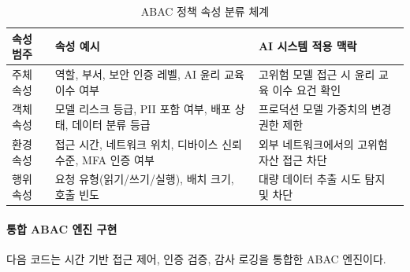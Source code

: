 \begin{table}[htbp]
\centering
\caption{ABAC 정책 속성 분류 체계}
\label{tab:abac_attributes}
\begin{tabularx}{\textwidth}{p{2cm}p{3cm}X}
\toprule
\textbf{속성 범주} & \textbf{속성 예시} & \textbf{AI 시스템 적용 맥락} \\
\midrule
주체 속성 & 역할, 부서, 보안 인증 레벨, AI 윤리 교육 이수 여부 & 고위험 모델 접근 시 윤리 교육 이수 요건 확인 \\
객체 속성 & 모델 리스크 등급, PII 포함 여부, 배포 상태, 데이터 분류 등급 & 프로덕션 모델 가중치의 변경 권한 제한 \\
환경 속성 & 접근 시간, 네트워크 위치, 디바이스 신뢰 수준, MFA 인증 여부 & 외부 네트워크에서의 고위험 자산 접근 차단 \\
행위 속성 & 요청 유형(읽기/쓰기/실행), 배치 크기, 호출 빈도 & 대량 데이터 추출 시도 탐지 및 차단 \\
\bottomrule
\end{tabularx}
\end{table}

\paragraph{통합 ABAC 엔진 구현}

다음 코드는 시간 기반 접근 제어, 인증 검증, 감사 로깅을 통합한 ABAC 엔진이다.

